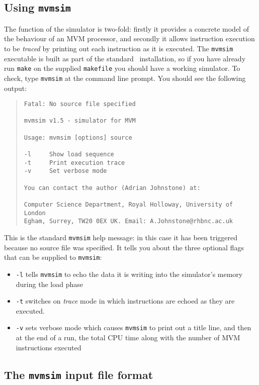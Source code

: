 \subsection{Using {\tt mvmsim}}
The function of the simulator is two-fold: firstly it provides a concrete model of the
behaviour of an MVM processor, and secondly it allows instruction execution to be
{\em traced} by printing out each instruction as it is executed. The {\tt mvmsim} executable
is built as part of the standard \rdp\ installation, so if you have already run {\tt make} 
on the supplied {\tt makefile} you should have a working simulator. To check, type
{\tt mvmsim} at the command line prompt. You should see the following output:
\begin{quote}
\hspace*{-1cm}
\begin{minipage}{30cm}
\small
\begin{verbatim}
Fatal: No source file specified

mvmsim v1.5 - simulator for MVM

Usage: mvmsim [options] source

-l     Show load sequence
-t     Print execution trace
-v     Set verbose mode

You can contact the author (Adrian Johnstone) at:

Computer Science Department, Royal Holloway, University of London
Egham, Surrey, TW20 0EX UK. Email: A.Johnstone@rhbnc.ac.uk
\end{verbatim}
\end{minipage}
\end{quote}

This is the standard {\tt mvmsim} help message: in this case it has been
triggered because no source file was specified. It tells you about the
three optional flags that can be supplied to {\tt mvmsim}:
\begin{itemize}
\item {\tt -l} tells {\tt mvmsim} to echo the data it is writing into the simulator's
memory during the load phase
\item {\tt -t} switches on {\em trace} mode in which instructions are echoed as they are
executed.
\item {\tt -v} sets verbose mode which causes {\tt mvmsim} to print out a title line,
and then at the end of a run, the total CPU time
along with the number of MVM instructions executed
\end{itemize}
 
\subsection{The {\tt mvmsim} input file format}

